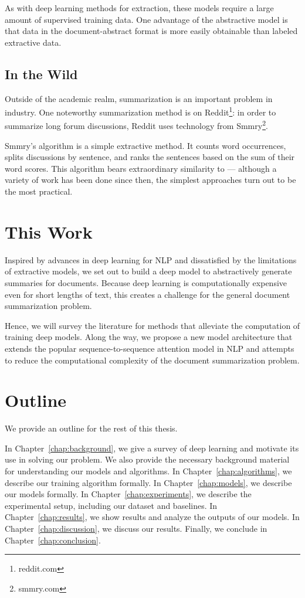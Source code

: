 \documentclass[12pt]{report}
\begin{document}
As with deep learning methods for extraction, these models require a large amount of supervised training data. One advantage of the abstractive model is that data in the document-abstract format is more easily obtainable than labeled extractive data.


\subsection{In the Wild}

Outside of the academic realm, summarization is an important problem in industry. One noteworthy summarization method is on Reddit\footnote{reddit.com}: in order to summarize long forum discussions, Reddit uses technology from Smmry\footnote{smmry.com}.

Smmry's algorithm is a simple extractive method. It counts word occurrences, splits discussions by sentence, and ranks the sentences based on the sum of their word scores. This algorithm bears extraordinary similarity to \citet{luhn1958automatic} --- although a variety of work has been done since then, the simplest approaches turn out to be the most practical.

\section{This Work}

Inspired by advances in deep learning for NLP and dissatisfied by the limitations of extractive models, we set out to build a deep model to abstractively generate summaries for documents. Because deep learning is computationally expensive even for short lengths of text, this creates a challenge for the general document summarization problem.

Hence, we will survey the literature for methods that alleviate the computation of training deep models. Along the way, we propose a new model architecture that extends the popular sequence-to-sequence attention model in NLP and attempts to reduce the computational complexity of the document summarization problem.

\section{Outline}


We provide an outline for the rest of this thesis.

In Chapter~\ref{chap:background}, we give a survey of deep learning and motivate its use in solving our problem. We also provide the necessary background material for understanding our models and algorithms.
In Chapter~\ref{chap:algorithms}, we describe our training algorithm formally.
In Chapter~\ref{chap:models}, we describe our models formally.
In Chapter~\ref{chap:experiments}, we describe the experimental setup, including our dataset and baselines. %
In Chapter~\ref{chap:results}, we show results and analyze the outputs of our models.
In Chapter~\ref{chap:discussion}, we discuss our results.
Finally, we conclude in Chapter~\ref{chap:conclusion}.
\end{document}

